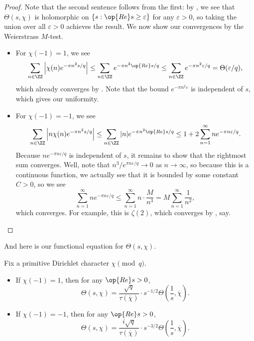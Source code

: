 \documentclass[../notes.tex]{subfiles}
\begin{document}
\begin{proof}
	Note that the second sentence follows from the first: by , we see that $\Theta(s,\chi)$ is holomorphic on $\{s:\op{Re}s\ge\varepsilon\}$ for any $\varepsilon>0$, so taking the union over all $\varepsilon>0$ achieves the result. We now show our convergences by the Weierstrass $M$-test.
	\begin{itemize}
		\item For $\chi(-1)=1$, we see
		\[\sum_{n\in\ZZ}\left|\chi(n)e^{-\pi n^2s/q}\right|\le\sum_{n\in\ZZ}e^{-\pi n^2\op{Re}s/q}\le\sum_{n\in\ZZ}e^{-\pi n^2\varepsilon/q}=\Theta(\varepsilon/q),\]
		which already converges by . Note that the bound $e^{-\pi n^2\varepsilon}$ is independent of $s$, which gives our uniformity.
		\item For $\chi(-1)=-1$, we see
		\[\sum_{n\in\ZZ}\left|n\chi(n)e^{-\pi n^2s/q}\right|\le\sum_{n\in\ZZ}|n|e^{-\pi n^2\op{Re}s/q}\le1+2\sum_{n=1}^\infty ne^{-\pi n\varepsilon/q}.\]
		Because $ne^{-\pi n\varepsilon/q}$ is independent of $s$, it remains to show that the rightmost sum converges. Well, note that $n^3/e^{\pi n\varepsilon/q}\to0$ as $n\to\infty$, so because this is a continuous function, we actually see that it is bounded by some constant $C>0$, so we see
		\[\sum_{n=1}^\infty ne^{-\pi n\varepsilon/q}\le\sum_{n=1}^\infty n\cdot\frac M{n^3}=M\sum_{n=1}^\infty\frac1{n^2},\]
		which converges. For example, this is $\zeta(2)$, which converges by , say.
		\qedhere
	\end{itemize}
\end{proof}
And here is our functional equation for $\Theta(s,\chi)$.
\begin{proposition}
	Fix a primitive Dirichlet character $\chi\pmod q$.
	\begin{itemize}
		\item If $\chi(-1)=1$, then for any $\op{Re}s>0$,
		\[\Theta(s,\chi)=\frac{\sqrt{q}}{\tau(\overline\chi)}\cdot s^{-1/2}\Theta\left(\frac1s,\overline\chi\right).\]
		\item If $\chi(-1)=-1$, then for any $\op{Re}s>0$,
		\[\Theta(s,\chi)=\frac{i\sqrt{q}}{\tau(\overline\chi)}\cdot s^{-3/2}\Theta\left(\frac1s,\overline\chi\right).\]
	\end{itemize}
\end{proposition}
\end{document}
